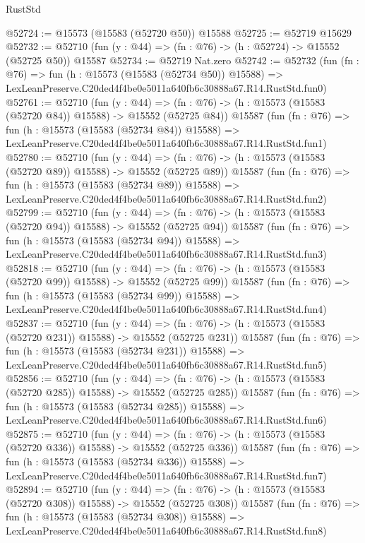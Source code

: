 \begin{lexlean}{RustStd}
\begin{coremodule}
@52724 := @15573 (@15583 (@52720 @50)) @15588
@52725 := @52719 @15629
@52732 := @52710 (fun (y : @44) => (fn : @76) -> (h : @52724) -> @15552 (@52725 @50)) @15587
@52734 := @52719 Nat.zero
@52742 := @52732
    (fun (fn : @76) =>
    fun (h : @15573 (@15583 (@52734 @50)) @15588) =>
    LexLeanPreserve.C20ded4f4be0e5011a640fb6c30888a67.R14.RustStd.fun0)
@52761 := @52710
    (fun (y : @44) =>
    (fn : @76) -> (h : @15573 (@15583 (@52720 @84)) @15588) -> @15552 (@52725 @84))
    @15587
    (fun (fn : @76) =>
    fun (h : @15573 (@15583 (@52734 @84)) @15588) =>
    LexLeanPreserve.C20ded4f4be0e5011a640fb6c30888a67.R14.RustStd.fun1)
@52780 := @52710
    (fun (y : @44) =>
    (fn : @76) -> (h : @15573 (@15583 (@52720 @89)) @15588) -> @15552 (@52725 @89))
    @15587
    (fun (fn : @76) =>
    fun (h : @15573 (@15583 (@52734 @89)) @15588) =>
    LexLeanPreserve.C20ded4f4be0e5011a640fb6c30888a67.R14.RustStd.fun2)
@52799 := @52710
    (fun (y : @44) =>
    (fn : @76) -> (h : @15573 (@15583 (@52720 @94)) @15588) -> @15552 (@52725 @94))
    @15587
    (fun (fn : @76) =>
    fun (h : @15573 (@15583 (@52734 @94)) @15588) =>
    LexLeanPreserve.C20ded4f4be0e5011a640fb6c30888a67.R14.RustStd.fun3)
@52818 := @52710
    (fun (y : @44) =>
    (fn : @76) -> (h : @15573 (@15583 (@52720 @99)) @15588) -> @15552 (@52725 @99))
    @15587
    (fun (fn : @76) =>
    fun (h : @15573 (@15583 (@52734 @99)) @15588) =>
    LexLeanPreserve.C20ded4f4be0e5011a640fb6c30888a67.R14.RustStd.fun4)
@52837 := @52710
    (fun (y : @44) =>
    (fn : @76) -> (h : @15573 (@15583 (@52720 @231)) @15588) -> @15552 (@52725 @231))
    @15587
    (fun (fn : @76) =>
    fun (h : @15573 (@15583 (@52734 @231)) @15588) =>
    LexLeanPreserve.C20ded4f4be0e5011a640fb6c30888a67.R14.RustStd.fun5)
@52856 := @52710
    (fun (y : @44) =>
    (fn : @76) -> (h : @15573 (@15583 (@52720 @285)) @15588) -> @15552 (@52725 @285))
    @15587
    (fun (fn : @76) =>
    fun (h : @15573 (@15583 (@52734 @285)) @15588) =>
    LexLeanPreserve.C20ded4f4be0e5011a640fb6c30888a67.R14.RustStd.fun6)
@52875 := @52710
    (fun (y : @44) =>
    (fn : @76) -> (h : @15573 (@15583 (@52720 @336)) @15588) -> @15552 (@52725 @336))
    @15587
    (fun (fn : @76) =>
    fun (h : @15573 (@15583 (@52734 @336)) @15588) =>
    LexLeanPreserve.C20ded4f4be0e5011a640fb6c30888a67.R14.RustStd.fun7)
@52894 := @52710
    (fun (y : @44) =>
    (fn : @76) -> (h : @15573 (@15583 (@52720 @308)) @15588) -> @15552 (@52725 @308))
    @15587
    (fun (fn : @76) =>
    fun (h : @15573 (@15583 (@52734 @308)) @15588) =>
    LexLeanPreserve.C20ded4f4be0e5011a640fb6c30888a67.R14.RustStd.fun8)

\end{coremodule}
\end{lexlean}
